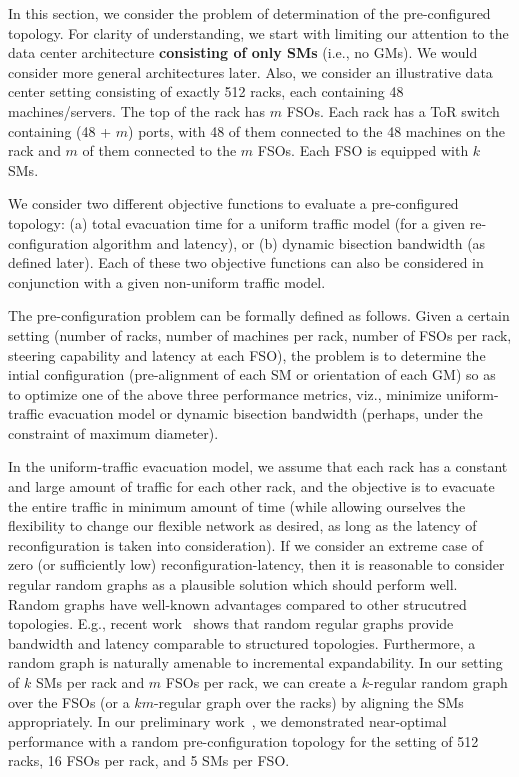 In this section, we consider the problem of determination of the
pre-configured topology. For clarity of understanding, we start with
limiting our attention to the data center architecture {\bf consisting
  of only SMs} (i.e., no GMs). We would consider more general
architectures later. Also, we consider an illustrative data center
setting consisting of exactly 512 racks, each containing 48
machines/servers. The top of the rack has $m$ FSOs.  Each rack has a
ToR switch containing (48 + $m$) ports, with 48 of them connected to
the 48 machines on the rack and $m$ of them connected to the $m$
FSOs. Each FSO is equipped with $k$ SMs.

 We consider two different objective
functions to evaluate a pre-configured topology: (a) total evacuation
time for a uniform traffic model (for a given re-configuration
algorithm and latency), or (b) dynamic bisection bandwidth (as defined
later). Each of these two objective functions can also be considered
in conjunction with a given non-uniform traffic model. 

 The pre-configuration
problem can be formally defined as follows. Given a certain setting
(number of racks, number of machines per rack, number of FSOs per
rack, steering capability and latency at each FSO), the problem is to
determine the intial configuration (pre-alignment of each SM or
orientation of each GM) so as to optimize one of the above three
performance metrics, viz., minimize uniform-traffic evacuation model
or dynamic bisection bandwidth (perhaps, under the constraint of
maximum diameter).

  In the uniform-traffic
evacuation model, we assume that each rack has a constant and large
amount of traffic for each other rack, and the objective is to
evacuate the entire traffic in minimum amount of time (while allowing
ourselves the flexibility to change our flexible network as desired,
as long as the latency of reconfiguration is taken into
consideration).  If we consider an extreme case of zero (or
sufficiently low) reconfiguration-latency, then it is reasonable to
consider regular random graphs as a plausible solution which should
perform well. Random graphs have well-known advantages compared to
other strucutred topologies. E.g., recent work~\cite{jellyfish} shows
that random regular graphs provide bandwidth and latency comparable to
structured topologies. Furthermore, a random graph is naturally
amenable to incremental expandability. In our setting of $k$ SMs per
rack and $m$ FSOs per rack, we can create a $k$-regular random graph
over the FSOs (or a $km$-regular graph over the racks) by aligning the
SMs appropriately. In our preliminary work~\cite{hotnets}, we
demonstrated near-optimal performance with a random pre-configuration
topology for the setting of 512 racks, 16 FSOs per rack, and 5 SMs per
FSO.

